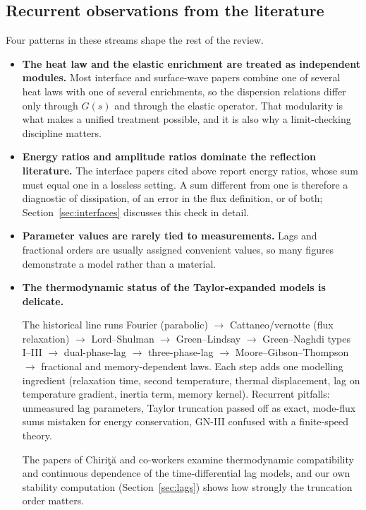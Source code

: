 \subsection{Recurrent observations from the literature}
Four patterns in these streams shape the rest of the review.
\begin{itemize}
\item \textbf{The heat law and the elastic enrichment are treated as independent modules.} Most interface and surface-wave papers combine one of several heat laws with one of several enrichments, so the dispersion relations differ only through $G(s)$ and through the elastic operator. That modularity is what makes a unified treatment possible, and it is also why a limit-checking discipline matters.
\item \textbf{Energy ratios and amplitude ratios dominate the reflection literature.} The interface papers cited above report energy ratios, whose sum must equal one in a lossless setting. A sum different from one is therefore a diagnostic of dissipation, of an error in the flux definition, or of both; Section~\ref{sec:interfaces} discusses this check in detail.
\item \textbf{Parameter values are rarely tied to measurements.} Lags and fractional orders are usually assigned convenient values, so many figures demonstrate a model rather than a material.
\item \textbf{The thermodynamic status of the Taylor-expanded models is delicate.}

\begin{summarybox}[Summary]
The historical line runs Fourier (parabolic) $\to$ Cattaneo/vernotte (flux relaxation) $\to$ Lord--Shulman $\to$ Green--Lindsay $\to$ Green--Naghdi types I--III $\to$ dual-phase-lag $\to$ three-phase-lag $\to$ Moore--Gibson--Thompson $\to$ fractional and memory-dependent laws. Each step adds one modelling ingredient (relaxation time, second temperature, thermal displacement, lag on temperature gradient, inertia term, memory kernel). Recurrent pitfalls: unmeasured lag parameters, Taylor truncation passed off as exact, mode-flux sums mistaken for energy conservation, GN-III confused with a finite-speed theory.
\end{summarybox} The papers of Chiri\c{t}\u{a} and co-workers \citep{Chirita2016,Tibullo2017} examine thermodynamic compatibility and continuous dependence of the time-differential lag models, and our own stability computation (Section~\ref{sec:lags}) shows how strongly the truncation order matters.
\end{itemize}
